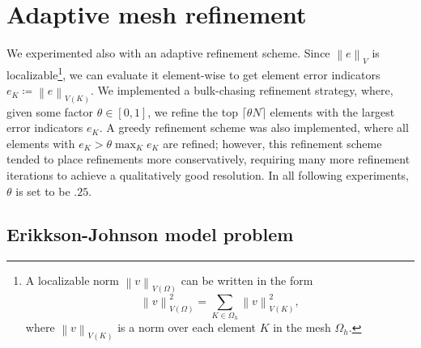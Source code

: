 \documentclass[final,leqno]{siamltex}
\newcommand{\nor}[1]{\left\| #1 \right\|}
\newcommand{\Oh}{\Omega_h}
\begin{document}
\section{Adaptive mesh refinement}

We experimented also with an adaptive refinement scheme.  Since $\nor{e}_V$ is localizable\footnote{A localizable norm $\nor{v}_{V(\Omega)}$ can be written in the form 
$$\nor{v}_{V(\Omega)}^2 = \sum_{K\in \Oh} \nor{v}_{V(K)}^2,$$ where $\nor{v}_{V(K)}$ is a norm over each element $K$ in the mesh $\Oh$.}, we can evaluate it element-wise to get element error indicators $e_K \coloneqq \nor{e}_{V(K)}$.  We implemented a bulk-chasing refinement strategy, where, given some factor $\theta \in [0,1]$, we refine the top $\lceil{\theta N}\rceil$ elements with the largest error indicators $e_K$.  A greedy refinement scheme was also implemented, where all elements with $e_K > \theta \max_K e_K$ are refined; however, this refinement scheme tended to place refinements more conservatively, requiring many more refinement iterations to achieve a qualitatively good resolution.  In all following experiments, $\theta$ is set to be $.25$.  

\subsection{Erikkson-Johnson model problem}
\end{document}

